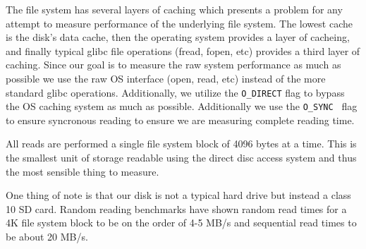 The file system has several layers of caching which presents a problem for any attempt to measure performance of the underlying file system.
The lowest cache is the disk's data cache, then the operating system provides a layer of cacheing, and finally typical glibc file operations (fread, fopen, etc) provides a third layer of caching.
Since our goal is to measure the raw system performance as much as possible we use the raw OS interface (open, read, etc) instead of the more standard glibc operations.
Additionally, we utilize the {\tt O_DIRECT} flag to bypass the OS caching system as much as possible.
Additionally we use the {\tt O_SYNC } flag to ensure syncronous reading to ensure we are  measuring complete reading time.

All reads are performed a single file system block of 4096 bytes at a time.
This is the smallest unit of storage readable using the direct disc access system and thus the most sensible thing to measure.

One thing of note is that our disk is not a typical hard drive but instead a class 10 SD card.
Random reading benchmarks \cite{sdcard_2} have shown random read times for a 4K file system block to be on the order of 4-5 MB/s and sequential read times to be about 20 MB/s.